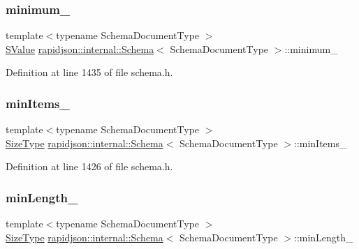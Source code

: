 \subsubsection{\texorpdfstring{minimum\_}{minimum\_}}
{\footnotesize\ttfamily template$<$typename Schema\+Document\+Type $>$ \\
\mbox{\hyperlink{classrapidjson_1_1internal_1_1_schema_a9f716b06fc542c4cdb7d8d5cf463bf79}{S\+Value}} \mbox{\hyperlink{classrapidjson_1_1internal_1_1_schema}{rapidjson\+::internal\+::\+Schema}}$<$ Schema\+Document\+Type $>$\+::minimum\+\_\+\hspace{0.3cm}{\ttfamily [private]}}



Definition at line 1435 of file schema.\+h.

\mbox{\label{classrapidjson_1_1internal_1_1_schema_a610be411821cbc1240d725cbf95f3748}} 
\subsubsection{\texorpdfstring{minItems\_}{minItems\_}}
{\footnotesize\ttfamily template$<$typename Schema\+Document\+Type $>$ \\
\mbox{\hyperlink{namespacerapidjson_a44eb33eaa523e36d466b1ced64b85c84}{Size\+Type}} \mbox{\hyperlink{classrapidjson_1_1internal_1_1_schema}{rapidjson\+::internal\+::\+Schema}}$<$ Schema\+Document\+Type $>$\+::min\+Items\+\_\+\hspace{0.3cm}{\ttfamily [private]}}



Definition at line 1426 of file schema.\+h.

\mbox{\label{classrapidjson_1_1internal_1_1_schema_a4ced2d5bfbc8557938c5fc4dc22f4c6c}} 
\subsubsection{\texorpdfstring{minLength\_}{minLength\_}}
{\footnotesize\ttfamily template$<$typename Schema\+Document\+Type $>$ \\
\mbox{\hyperlink{namespacerapidjson_a44eb33eaa523e36d466b1ced64b85c84}{Size\+Type}} \mbox{\hyperlink{classrapidjson_1_1internal_1_1_schema}{rapidjson\+::internal\+::\+Schema}}$<$ Schema\+Document\+Type $>$\+::min\+Length\+\_\+\hspace{0.3cm}{\ttfamily [private]}}



